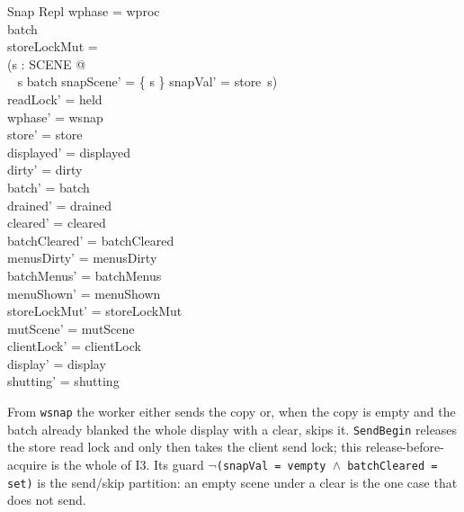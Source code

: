 \documentclass[a4paper,10pt,fleqn]{article}
\begin{document}
\begin{schema}{Snap}
  \Delta Repl
\where
  wphase = wproc \\
  batch \neq \emptyset \\
  storeLockMut = \emptyset \\
  (\exists s : SCENE @ \\
  \quad~ s \in batch \land snapScene' = \{ s \} \land snapVal' = store~s) \\
  readLock' = held \\
  wphase' = wsnap \\
  store' = store \\
  displayed' = displayed \\
  dirty' = dirty \\
  batch' = batch \\
  drained' = drained \\
  cleared' = cleared \\
  batchCleared' = batchCleared \\
  menusDirty' = menusDirty \\
  batchMenus' = batchMenus \\
  menuShown' = menuShown \\
  storeLockMut' = storeLockMut \\
  mutScene' = mutScene \\
  clientLock' = clientLock \\
  display' = display \\
  shutting' = shutting
\end{schema}

From \texttt{wsnap} the worker either sends the copy or, when the copy is
empty and the batch already blanked the whole display with a clear, skips
it.  \texttt{SendBegin} releases the store read lock and only then takes the
client send lock; this release-before-acquire is the whole of I3.  Its
guard \texttt{$\lnot$(snapVal = vempty $\land$ batchCleared = set)} is the
send/skip partition: an empty scene under a clear is the one case that does
not send.
\end{document}
